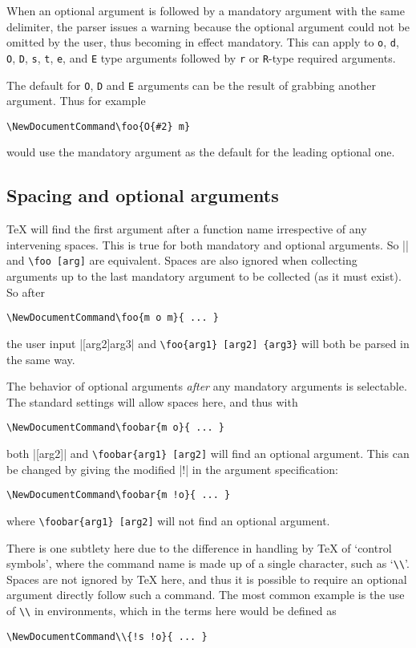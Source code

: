 \documentclass{ltxguide}
\begin{document}
When an optional argument is followed by a mandatory argument with the same
delimiter, the parser issues a warning because the optional argument could not
be omitted by the user, thus becoming in effect mandatory. This can apply to
\texttt{o}, \texttt{d}, \texttt{O}, \texttt{D}, \texttt{s}, \texttt{t},
\texttt{e}, and \texttt{E} type arguments followed by \texttt{r} or
\texttt{R}-type required arguments.

The default for \texttt{O}, \texttt{D} and \texttt{E} arguments can be
the result of grabbing another argument. Thus for example
\begin{verbatim}
\NewDocumentCommand\foo{O{#2} m}
\end{verbatim}
would use the mandatory argument as the default for the leading optional
one.

\subsection{Spacing and optional arguments}
\label{sec:cmd:opt-space}

\TeX{} will find the first argument after a function name irrespective of any
intervening spaces. This is true for both mandatory and optional arguments. So
|\foo[arg]| and \verb*|\foo [arg]| are equivalent. Spaces are also ignored when
collecting arguments up to the last mandatory argument to be collected (as it
must exist). So after
\begin{verbatim}
\NewDocumentCommand\foo{m o m}{ ... }
\end{verbatim}
the user input |[arg2]{arg3}| and \verb*|\foo{arg1} [arg2] {arg3}|
will both be parsed in the same way.

The behavior of optional arguments \emph{after} any mandatory arguments is
selectable. The standard settings will allow spaces here, and thus with
\begin{verbatim}
\NewDocumentCommand\foobar{m o}{ ... }
\end{verbatim}
both |[arg2]| and \verb*|\foobar{arg1} [arg2]| will find an
optional argument. This can be changed by giving the modified |!| in the
argument specification:
\begin{verbatim}
\NewDocumentCommand\foobar{m !o}{ ... }
\end{verbatim}
where \verb*|\foobar{arg1} [arg2]| will not find an optional argument.

There is one subtlety here due to the difference in handling by \TeX{} of
`control symbols', where the command name is made up of a single
character, such as `\texttt{\textbackslash\textbackslash}'.
Spaces are not ignored by \TeX{} here,
and thus it is possible to require an optional argument directly follow such a
command. The most common example is the use of \texttt{\textbackslash\textbackslash}
in  environments, which in the terms here would be defined as
\begin{verbatim}
\NewDocumentCommand\\{!s !o}{ ... }
\end{verbatim}
\end{document}
